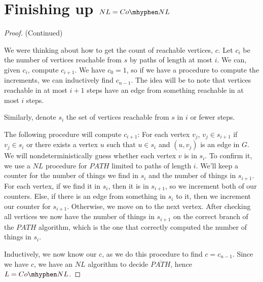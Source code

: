 




\section*{Finishing up $NL=Co\mhyphen NL$}


\begin{proof}
	
	(Continued)
	

	
	We were thinking about how to get the count of reachable vertices, $c$.  Let $c_i$ be the number of vertices reachable from $s$ by paths of length at most $i$.  We can, given $c_i$, compute $c_{i+1}$.  We have $c_0=1$, so if we have a procedure to compute the increments, we can inductively find $c_{n-1}$.  The idea will be to note that vertices reachable in at most $i+1$ steps have an edge from something reachable in at most $i$ steps.  
	
	Similarly, denote $s_i$ the set of vertices reachable from $s$ in $i$ or fewer steps.
	
	The following procedure will compute $c_{i+1}$: For each vertex $v_j$, $v_j\in s_{i+1}$ if $v_j\in s_i$ or there exists a vertex $u$ such that $u\in s_i$ and $(u,v_j)$ is an edge in $G$.  We will nondeterministically guess whether each vertex $v$ is in $s_{i}$.  To confirm it, we use a $NL$ procedure for $PATH$ limited to paths of length $i$.  We'll keep a counter for the number of things we find in $s_i$ and the number of things in $s_{i+1}$.  For each vertex, if we find it in $s_i$, then it is in $s_{i+1}$, so we increment both of our counters.  Else, if there is an edge from something in $s_i$ to it, then we increment our counter for $s_{i+1}$.  Otherwise, we move on to the next vertex.  After checking all vertices we now have the number of things in $s_{i+1}$ on the correct branch of the $PATH$ algorithm, which is the one that correctly computed the number of things in $s_i$.
	
	Inductively, we now know our $c$, as we do this procedure to find $c=c_{n-1}$.  Since we have $c$, we have an $NL$ algorithm to decide $\overline{PATH}$, hence $L=Co\mhyphen NL$.
	
	
	
	
	
\end{proof}


